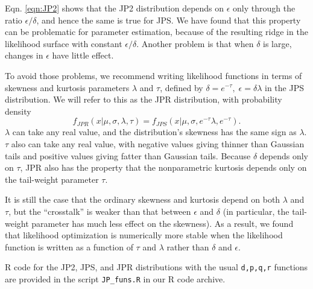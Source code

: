 \documentclass[12pt]{article}
\newcommand{\be}{\begin{equation}}
\newcommand{\ee}{\end{equation}}
\begin{document}
\begin{spacing}{1.35}
Eqn. \eqref{eqn:JP2} shows that the JP2 distribution depends on $\epsilon$ only through 
the ratio $\epsilon/\delta$, and hence the same is true for JPS. 
We have found that this property can be problematic for parameter estimation, 
because of the resulting ridge in the likelihood surface with constant  
$\epsilon/\delta$. Another problem is that when $\delta$ is large, changes 
in $\epsilon$ have little effect. 

To avoid those problems, we recommend writing likelihood functions in terms of 
skewness and kurtosis parameters $\lambda$ and $\tau$, defined by 
$\delta = e^{-\tau}, \; \epsilon =  \delta \lambda$ in the 
JPS distribution. We will refer to this as the JPR distribution, with probability density 
\be
f_{JPR}(x \vert \mu, \sigma, \lambda, \tau) = f_{JPS}(x \vert \mu, \sigma, e^{-\tau}\lambda,  e^{-\tau}). 
\ee
$\lambda$ can take any real value, and the distribution's skewness has the same sign as $\lambda$. 
$\tau$ also can take any real value, with negative values giving thinner than Gaussian tails 
and positive values giving fatter than Gaussian tails. Because $\delta$ depends only on $\tau$, 
JPR also has the property that the nonparametric kurtosis depends only on the tail-weight parameter $\tau$. 

It is still the case that the ordinary skewness and kurtosis depend on both $\lambda$ and $\tau$, but the
``crosstalk'' is weaker than that between $\epsilon$ and $\delta$ (in particular, the tail-weight parameter
has much less effect on the skewness).  
As a result, we found that likelihood optimization is numerically more stable when the likelihood function is 
written as a function of $\tau$ and $\lambda$ rather than $\delta$ and $\epsilon$. 

R code for the JP2, JPS, and JPR distributions with the usual \texttt{d,p,q,r} functions are provided 
in the script \texttt{JP\_funs.R} in our R code archive. 


\end{spacing}
\end{document}
